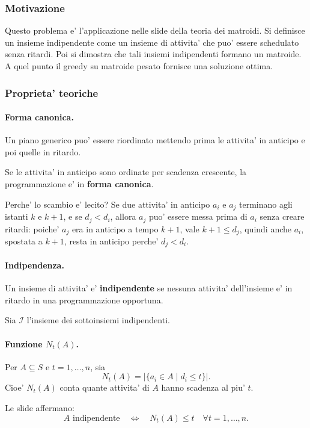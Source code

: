 \subsubsection{Motivazione}
Questo problema e' l'applicazione nelle slide della teoria dei matroidi. Si definisce un insieme indipendente come un insieme di attivita' che puo' essere schedulato senza ritardi. Poi si dimostra che tali insiemi indipendenti formano un matroide. A quel punto il greedy su matroide pesato fornisce una soluzione ottima.

\subsubsection{Proprieta' teoriche}
\paragraph{Forma canonica.}
Un piano generico puo' essere riordinato mettendo prima le attivita' in anticipo e poi quelle in ritardo.

Se le attivita' in anticipo sono ordinate per scadenza crescente, la programmazione e' in \textbf{forma canonica}.

Perche' lo scambio e' lecito? Se due attivita' in anticipo $a_i$ e $a_j$ terminano agli istanti $k$ e $k+1$, e se $d_j<d_i$, allora $a_j$ puo' essere messa prima di $a_i$ senza creare ritardi: poiche' $a_j$ era in anticipo a tempo $k+1$, vale $k+1\le d_j$, quindi anche $a_i$, spostata a $k+1$, resta in anticipo perche' $d_j<d_i$.

\paragraph{Indipendenza.}
Un insieme di attivita' e' \textbf{indipendente} se nessuna attivita' dell'insieme e' in ritardo in una programmazione opportuna.

Sia $\mathcal{I}$ l'insieme dei sottoinsiemi indipendenti.

\paragraph{Funzione $N_t(A)$.}
Per $A\subseteq S$ e $t=1,\ldots,n$, sia
\[
N_t(A)=|\{a_i\in A\mid d_i\le t\}|.
\]
Cioe' $N_t(A)$ conta quante attivita' di $A$ hanno scadenza al piu' $t$.

Le slide affermano:
\[
A\text{ indipendente}
\quad\Longleftrightarrow\quad
N_t(A)\le t\quad\forall t=1,\ldots,n.
\]

